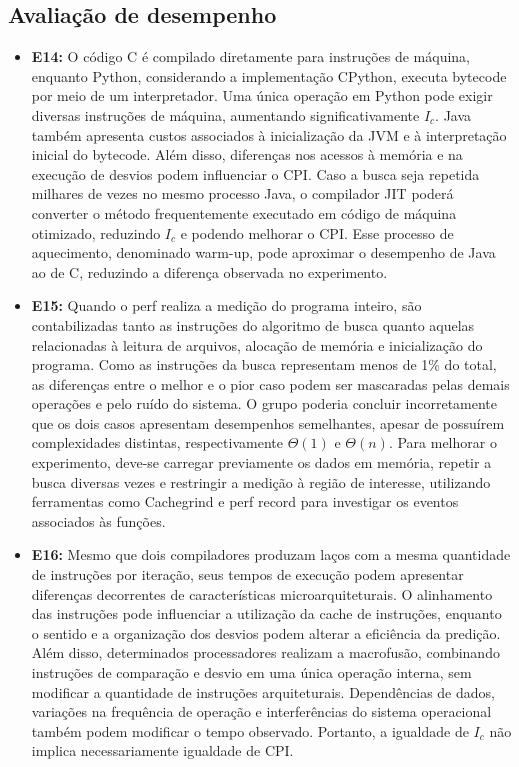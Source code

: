 \documentclass[12pt,a4paper,titlepage]{article}
\begin{document}
\subsection{Avaliação de desempenho}
\begin{itemize}
    \item\textbf{E14:}
        O código C é compilado diretamente para instruções de máquina, enquanto Python, considerando a implementação CPython,
        executa bytecode por meio de um interpretador. Uma única operação em Python pode exigir diversas instruções de máquina,
        aumentando significativamente $I_c$.
        Java também apresenta custos associados à inicialização da JVM e à interpretação inicial do bytecode. Além disso,
        diferenças nos acessos à memória e na execução de desvios podem influenciar o CPI.
        Caso a busca seja repetida milhares de vezes no mesmo processo Java, o compilador JIT poderá converter o método
        frequentemente executado em código de máquina otimizado, reduzindo $I_c$ e podendo melhorar o CPI.
        Esse processo de aquecimento, denominado warm-up, pode aproximar o desempenho de Java ao de C, reduzindo a diferença
        observada no experimento.

    \item\textbf{E15:}
        Quando o perf realiza a medição do programa inteiro, são contabilizadas tanto as instruções do algoritmo de busca
        quanto aquelas relacionadas à leitura de arquivos, alocação de memória e inicialização do programa.
        Como as instruções da busca representam menos de 1\% do total, as diferenças entre o melhor e o pior caso podem ser
        mascaradas pelas demais operações e pelo ruído do sistema.
        O grupo poderia concluir incorretamente que os dois casos apresentam desempenhos semelhantes, apesar de possuírem
        complexidades distintas, respectivamente $\Theta(1)$ e $\Theta(n)$.
        Para melhorar o experimento, deve-se carregar previamente os dados em memória, repetir a busca diversas vezes e
        restringir a medição à região de interesse, utilizando ferramentas como Cachegrind e perf record para investigar
        os eventos associados às funções.

    \item\textbf{E16:}
        Mesmo que dois compiladores produzam laços com a mesma quantidade de instruções por iteração, seus tempos de execução
        podem apresentar diferenças decorrentes de características microarquiteturais.
        O alinhamento das instruções pode influenciar a utilização da cache de instruções, enquanto o sentido e a organização
        dos desvios podem alterar a eficiência da predição.
        Além disso, determinados processadores realizam a macrofusão, combinando instruções de comparação e desvio em uma
        única operação interna, sem modificar a quantidade de instruções arquiteturais.
        Dependências de dados, variações na frequência de operação e interferências do sistema operacional também podem
        modificar o tempo observado. Portanto, a igualdade de $I_c$ não implica necessariamente igualdade de CPI.


\end{itemize}
\end{document}
